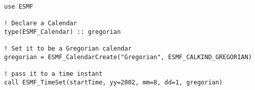 
\begin{verbatim}
use ESMF

! Declare a Calendar
type(ESMF_Calendar) :: gregorian

! Set it to be a Gregorian calendar
gregorian = ESMF_CalendarCreate("Gregorian", ESMF_CALKIND_GREGORIAN)

! pass it to a time instant
call ESMF_TimeSet(startTime, yy=2002, mm=8, dd=1, gregorian)
\end{verbatim}
